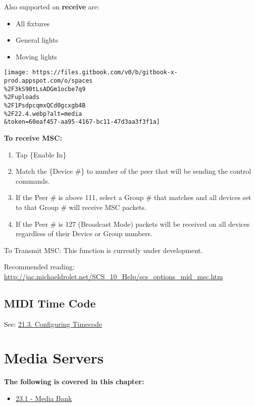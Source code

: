 \documentclass[
]{article}
\providecommand{\tightlist}{%
  \setlength{\itemsep}{0pt}\setlength{\parskip}{0pt}}
\begin{document}
Also supported on \textbf{receive} are:

\begin{itemize}
\item
  All fixtures
\item
  General lights
\item
  Moving lights
\end{itemize}

\texttt{[image: https://files.gitbook.com/v0/b/gitbook-x-prod.appspot.com/o/spaces\\\%2F3kS90tLsADGm1ocbe7q9\\\%2Fuploads\\\%2F1PsdpcqmxQCd0gcxgb4B\\\%2F22.4.webp?alt=media\\\&token=60eaf457-aa95-4167-bc11-47d3aa3f3f1a]}

\textbf{To receive MSC:}

\begin{enumerate}
\def\labelenumi{\arabic{enumi}.}
\item
  Tap \{Enable In\}
\item
  Match the \{Device \#\} to number of the peer that will be sending the control commands.
\item
  If the Peer \# is above 111, select a Group \# that matches and all devices set to that Group \# will receive MSC packets.
\item
  If the Peer \# is 127 (Broadcast Mode) packets will be received on all devices regardless of their Device or Group numbers.
\end{enumerate}

{To Transmit MSC: This function is currently under development. }

Recommended reading: \url{http://jac.michaeldrolet.net/SCS_10_Help/scs_options_mid_msc.htm}

\hypertarget{midi-time-code}{%
\subsection{MIDI Time Code}\label{midi-time-code}}

See:
\href{https://vibemanual.compulite.com/time-code.html\#configuring-timecode}{21.3. Configuring Timecode}

\hypertarget{media-servers}{%
\section{Media Servers}\label{media-servers}}

\textbf{The following is covered in this chapter:}

\begin{itemize}
\tightlist
\item
  \href{https://vibemanual.compulite.com/media-servers.html\#media-bank}{23.1 - Media Bank}
\end{itemize}
\end{document}
